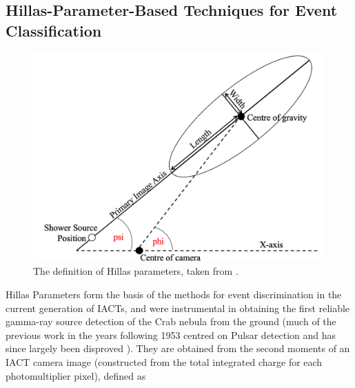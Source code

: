 \subsection{Hillas-Parameter-Based Techniques for Event Classification}

\begin{figure}[ht] 
        \centering \includegraphics[width=\columnwidth]{figures/hillas.png}
        \caption{
                \label{fig:hillas} %
                The definition of Hillas parameters, taken from \cite{ctapipe}.
        }
\end{figure}
Hillas Parameters form the basis of the methods for event discrimination in the current generation of IACTs, and were instrumental in obtaining the first reliable gamma-ray source detection of the Crab nebula from the ground \cite{whipple} (much of the previous work in the years following 1953 centred on Pulsar detection and has since largely been disproved \cite{paulathesis}). They are obtained \cite{tomthesis} \cite{weekestev} from the second moments of an IACT camera image (constructed from the total integrated charge for each photomultiplier pixel), defined as 
